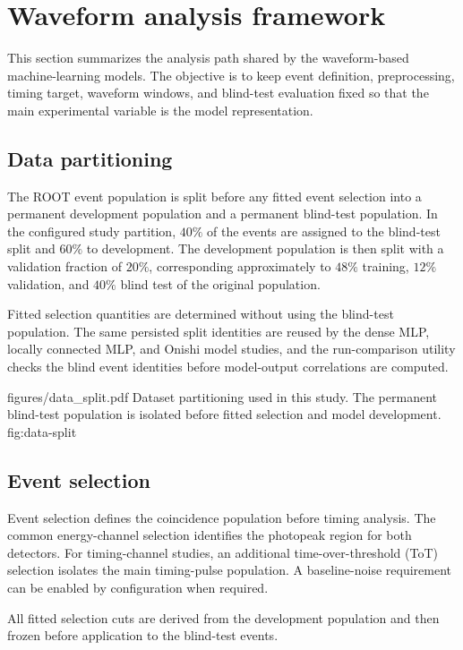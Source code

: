 \section{Waveform analysis framework}

This section summarizes the analysis path shared by the waveform-based machine-learning models. The objective is to keep event definition, preprocessing, timing target, waveform windows, and blind-test evaluation fixed so that the main experimental variable is the model representation.

\subsection{Data partitioning}

The ROOT event population is split before any fitted event selection into a permanent development population and a permanent blind-test population. In the configured study partition, \(40\%\) of the events are assigned to the blind-test split and \(60\%\) to development. The development population is then split with a validation fraction of \(20\%\), corresponding approximately to \(48\%\) training, \(12\%\) validation, and \(40\%\) blind test of the original population.

Fitted selection quantities are determined without using the blind-test population. The same persisted split identities are reused by the dense MLP, locally connected MLP, and Onishi model studies, and the run-comparison utility checks the blind event identities before model-output correlations are computed.

\reportfigure
    {figures/data_split.pdf}
    {Dataset partitioning used in this study. The permanent blind-test population is isolated before fitted selection and model development.}
    {fig:data-split}

\subsection{Event selection}

Event selection defines the coincidence population before timing analysis. The common energy-channel selection identifies the photopeak region for both detectors. For timing-channel studies, an additional time-over-threshold (ToT) selection isolates the main timing-pulse population. A baseline-noise requirement can be enabled by configuration when required.

All fitted selection cuts are derived from the development population and then frozen before application to the blind-test events.

